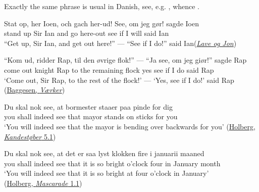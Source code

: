 Exactly the same phrase is usual in Danish, see, e.g. , whence .

\ea \label{ex:04-114}
\gll Stat op, her Ioen, och gach her-ud! See, om jeg gør! sagde Ioen\\
stand up Sir Ian and go here-out see if I will said Ian\\ %
\glt ``Get up, Sir Ian, and get out here!'' --- ``See if I do!'' said Ian\hfill(\href{https://archive.org/details/danmarksgamlefo03denmgoog/page/52/mode/2up?view=theater}{\textit{Lave og Jon}}) %
\z

\ea \label{ex:04-115}
\ea
\gll ``Kom ud, ridder Rap, til den øvrige flok!'' --- ``Ja see, om jeg giør!'' sagde Rap\\
come out knight Rap to the remaining flock {} yes see if I do said Rap\\
\glt `Come out, Sir Rap, to the rest of the flock!' --- `Yes, see if I do!' said Rap \hfill(\href{https://archive.org/details/jensbaggesensda02unkngoog/page/n192/mode/2up?q=\%22Kom+ud%2C+Ridder+Rap%2C+til+den+%C3%B8vrige+Flok%21%E2%80%9C+%E2%80%94+%E2%80%9EJa+fee%2C+om+jeg+gj%C3%B8r%21\%22&view=theater}{Baggesen, \textit{Værker}}) %

\ex
\gll Du skal nok see, at bormester staaer paa pinde for dig\\
you shall indeed see that mayor stands on sticks for you\\
\glt `You will indeed see that the mayor is bending over backwards for you'
\hfill(\href{https://archive.org/details/holbergskomedie01martgoog/page/68/mode/2up?q=\%22Du+skal+nok+see%2C+at+bormester+staaer+paa+pinde+for+dig\%22&view=theater}{Holberg, \textit{Kandestøber} 5.1})

\ex
\gll Du skal nok see, at det er saa lyst klokken fire i januarii maaned\\
you shall indeed see that it is so bright {o'clock} four in January month\\
\glt `You will indeed see that it is so bright at four o'clock in January'\\
\hfill(\href{http://holbergsskrifter.dk/holberg-public/view?docId=skuespill%2FMascarade%2FMascarade_mod.page&toc.depth=1&brand=&chunk.id=act1&toc.id=act1}{Holberg, \textit{Mascarade} 1.1})
\z
\z
{}

